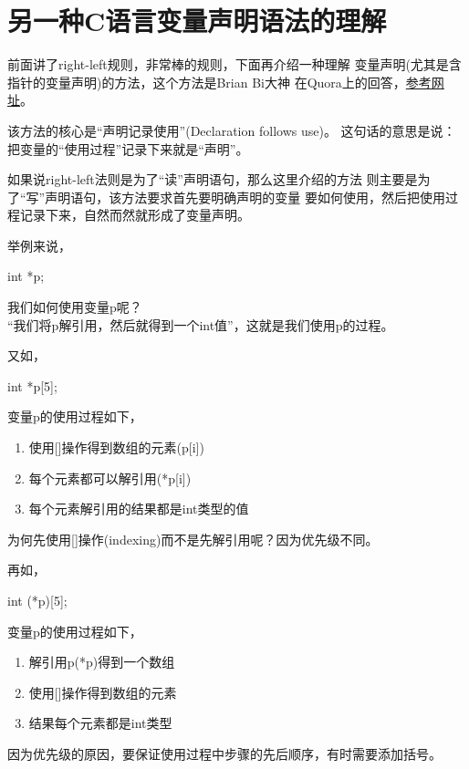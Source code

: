 \section[Variable declaration(another way)]{另一种C语言变量声明语法的理解}
前面讲了right-left规则，非常棒的规则，下面再介绍一种理解
变量声明(尤其是含指针的变量声明)的方法，这个方法是Brian Bi大神
在Quora上的回答，\href{http://www.quora.com/C-programming-language/Why-doesnt-C-use-better-notation-for-pointers/answer/Brian-Bi}{参考网址}。

该方法的核心是“声明记录使用”(Declaration follows use)。
这句话的意思是说：把变量的“使用过程”记录下来就是“声明”。

如果说right-left法则是为了“读”声明语句，那么这里介绍的方法
则主要是为了“写”声明语句，该方法要求首先要明确声明的变量
要如何使用，然后把使用过程记录下来，自然而然就形成了变量声明。

举例来说，

\begin{cppcode}
  int *p;
\end{cppcode}

我们如何使用变量p呢？\\
“我们将p解引用，然后就得到一个int值”，这就是我们使用p的过程。

又如，

\begin{cppcode}
  int *p[5];
\end{cppcode}

变量p的使用过程如下，
\begin{enumerate}
  \item 使用[]操作得到数组的元素(p[i])
  \item 每个元素都可以解引用(*p[i])
  \item 每个元素解引用的结果都是int类型的值
\end{enumerate}
为何先使用[]操作(indexing)而不是先解引用呢？因为优先级不同。

再如，

\begin{cppcode}
  int (*p)[5];
\end{cppcode}

变量p的使用过程如下，
\begin{enumerate}
  \item 解引用p(*p)得到一个数组
  \item 使用[]操作得到数组的元素
  \item 结果每个元素都是int类型
\end{enumerate}
因为优先级的原因，要保证使用过程中步骤的先后顺序，有时需要添加括号。


